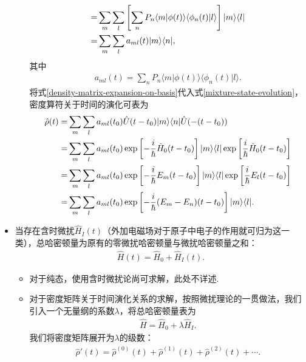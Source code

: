 \documentclass{assignment}
\begin{document}
\begin{itemize}
\begin{itemize}
\begin{align}
            \notag=&\sum_m\sum_l\left[\sum_nP_n\langle m\vert\phi(t)\rangle\langle\phi_n(t)\vert l\rangle\right]\lvert m\rangle\langle l\rvert\\
            =&\sum_m\sum_la_{ml}(t)\lvert m\rangle\langle n\rvert,
        \end{align}
        其中
        \begin{align}
            a_{ml}(t)=\sum_nP_n\langle m\vert\phi(t)\rangle\langle\phi_n(t)\vert l\rangle.
        \end{align}
        将式\eqref{density-matrix-expansion-on-basis}代入式\eqref{mixture-state-evolution}，密度算符关于时间的演化可表为
        \begin{align}
            \notag\hat{\rho}(t)=&\sum_m\sum_la_{ml}(t_0)\hat{U}(t-t_0)\lvert m\rangle\langle n\rvert\hat{U}(-(t-t_0))\\
            \notag=&\sum_m\sum_la_{ml}(t_0)\exp\left[-\frac{i}{\hbar}\hat{H}_0(t-t_0)\right]\lvert m\rangle\langle l\rvert\exp\left[\frac{i}{\hbar}\hat{H}_0(t-t_0)\right]\\
            \notag=&\sum_m\sum_la_{ml}(t_0)\exp\left[-\frac{i}{\hbar}E_m(t-t_0)\right]\lvert m\rangle\langle l\rvert\exp\left[\frac{i}{\hbar}E_l(t-t_0)\right]\\
            =&\sum_m\sum_la_{ml}(t_0)\exp\left[-\frac{i}{\hbar}(E_m-E_n)(t-t_0)\right]\lvert m\rangle\langle l\rvert.
        \end{align}
    \end{itemize}
    \item 当存在含时微扰$\hat{H}_I(t)$（外加电磁场对于原子中电子的作用就可归为这一类），总哈密顿量为原有的零微扰哈密顿量与微扰哈密顿量之和：
    \begin{align}
        \label{time-dep-Hamiltonian}
        \hat{H}(t)=\hat{H}_0+\hat{H}_I(t).
    \end{align}
    \begin{itemize}
        \item 对于纯态，使用含时微扰论尚可求解，此处不详述.
        \item 对于密度矩阵关于时间演化关系的求解，按照微扰理论的一贯做法，我们引入一个无量纲的系数$\lambda$，将总哈密顿量表为
        \begin{align}
            \hat{H}=\hat{H}_0+\lambda\hat{H}_I.
        \end{align}
        我们将密度矩阵展开为$\lambda$的级数：
        \begin{align}
            \label{density-matrix-expansion}
            \hat{\rho}'(t)=\hat{\rho}^{(0)}(t)+\hat{\rho}^{(1)}(t)+\hat{\rho}^{(2)}(t)+\cdots.

\end{align}
\end{itemize}
\end{itemize}
\end{document}
